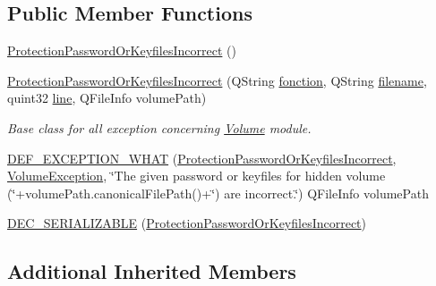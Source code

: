 \subsection*{Public Member Functions}
\begin{DoxyCompactItemize}
\item 
\hyperlink{class_gost_crypt_1_1_volume_1_1_protection_password_or_keyfiles_incorrect_a7bba527ee99b5e555a7a4fd012a4b9c8}{Protection\+Password\+Or\+Keyfiles\+Incorrect} ()
\item 
\hyperlink{class_gost_crypt_1_1_volume_1_1_protection_password_or_keyfiles_incorrect_a52b5a0f3ecdb8f1035fe374e4f69b4fb}{Protection\+Password\+Or\+Keyfiles\+Incorrect} (Q\+String \hyperlink{class_gost_crypt_1_1_gost_crypt_exception_a29b8c93d5efbb1ff369107385725a939}{fonction}, Q\+String \hyperlink{class_gost_crypt_1_1_gost_crypt_exception_a749a12375f4ba9d502623b99d8252f38}{filename}, quint32 \hyperlink{class_gost_crypt_1_1_gost_crypt_exception_abf506d911f12a4e969eea500f90bd32c}{line}, Q\+File\+Info volume\+Path)
\begin{DoxyCompactList}\small\item\em Base class for all exception concerning \hyperlink{class_gost_crypt_1_1_volume_1_1_volume}{Volume} module. \end{DoxyCompactList}\item 
\hyperlink{class_gost_crypt_1_1_volume_1_1_protection_password_or_keyfiles_incorrect_a438c711d3484c557bbd0c800a1762a3c}{D\+E\+F\+\_\+\+E\+X\+C\+E\+P\+T\+I\+O\+N\+\_\+\+W\+H\+AT} (\hyperlink{class_gost_crypt_1_1_volume_1_1_protection_password_or_keyfiles_incorrect}{Protection\+Password\+Or\+Keyfiles\+Incorrect}, \hyperlink{class_gost_crypt_1_1_volume_1_1_volume_exception}{Volume\+Exception}, \char`\"{}The given password or keyfiles for hidden volume (\char`\"{}+volume\+Path.\+canonical\+File\+Path()+\char`\"{}) are incorrect.\char`\"{}) Q\+File\+Info volume\+Path
\item 
\hyperlink{class_gost_crypt_1_1_volume_1_1_protection_password_or_keyfiles_incorrect_af720932119e4b2ac8ae613a170f2be2a}{D\+E\+C\+\_\+\+S\+E\+R\+I\+A\+L\+I\+Z\+A\+B\+LE} (\hyperlink{class_gost_crypt_1_1_volume_1_1_protection_password_or_keyfiles_incorrect}{Protection\+Password\+Or\+Keyfiles\+Incorrect})
\end{DoxyCompactItemize}
\subsection*{Additional Inherited Members}


